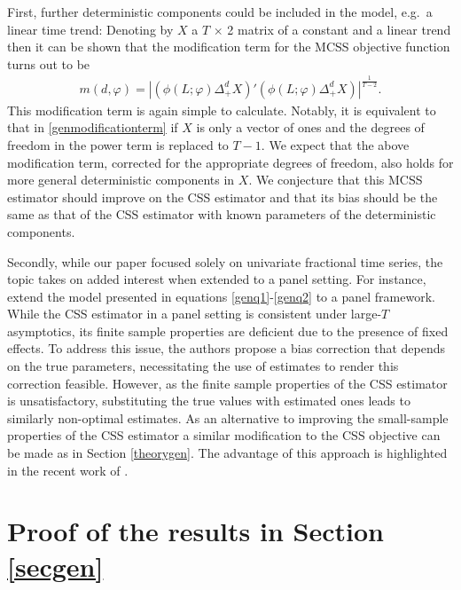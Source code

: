 {{First, further deterministic components could be included in the model, e.g.\ a linear time trend: Denoting by $X$ a $T$ $\times$ 2 matrix of a constant and a linear trend then it can be shown that the modification term for the
MCSS objective function turns out to be
 \begin{align*}
          m(d,\varphi) = \left|(\phi(L;\varphi)\Delta_+^{d}X)'(\phi(L;\varphi)\Delta_+^{d}X)\right|^{\frac{1}{T-2}}. 
\end{align*}  
This modification term is again simple to calculate. Notably, it is equivalent to that in \eqref{genmodificationterm} if $X$ is only a vector of ones and the degrees of freedom in the power term is replaced to $T-1$. We expect
that the above modification term, corrected for the appropriate degrees of freedom, also holds for more general deterministic components in $X$. We conjecture that this MCSS estimator should improve on the CSS estimator and that
its bias should be the same as that of the CSS estimator with known parameters of the deterministic components.

Secondly, while our paper focused solely on univariate fractional time series, the topic takes on added interest when extended to a panel setting. For instance, \textcite{robinson2015efficient} extend the model presented in
equations \eqref{genq1}-\eqref{genq2} to a panel framework. While the CSS estimator in a panel setting is consistent under large-$T$ asymptotics, its finite sample properties are deficient due to the presence of fixed effects. To
address this issue, the authors propose a bias correction that depends on the true parameters, necessitating the use of estimates to render this correction feasible. However, as the finite sample properties of the CSS estimator is
unsatisfactory, substituting the true values with estimated ones leads to similarly non-optimal estimates. As an alternative to improving the small-sample properties of the CSS estimator a similar modification to the CSS objective
can be made as in Section \ref{theorygen}. The advantage of this approach is highlighted in the recent work of \textcite{schumann2023role}.
  





\printbibliography
\newpage

\appendix
{} \renewcommand\theequation{\thesection.\arabic{equation}} 
\section{Proof of the results in Section \ref{secgen}} \label{Appendixgeneraldgen}

}}
